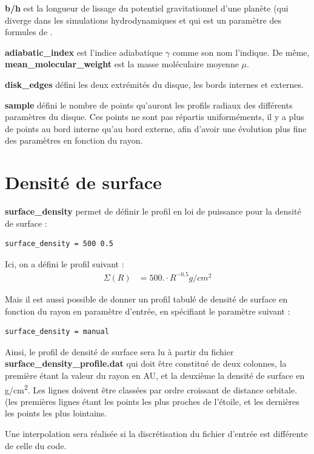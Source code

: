 \textbf{b/h} est la longueur de lissage du potentiel gravitationnel d'une planète (qui diverge dans les simulations hydrodynamiques et qui est un paramètre des formules de \cite{paardekooper2011torque}.

\textbf{adiabatic\_index} est l'indice adiabatique $\gamma$ comme son nom l'indique. De même, \textbf{mean\_molecular\_weight} est la masse moléculaire moyenne $\mu$.

\textbf{disk\_edges} défini les deux extrémités du disque, les bords internes et externes.

\textbf{sample} défini le nombre de points qu'auront les profils radiaux des différents paramètres du disque. Ces points ne sont pas répartis uniforméments, il y a plus de points au bord interne qu'au bord externe, afin d'avoir une évolution plus fine des paramètres en fonction du rayon.

\section{Densité de surface}
\textbf{surface\_density} permet de définir le profil en loi de puissance pour la densité de surface : 
\begin{verbatim}
surface_density = 500 0.5
\end{verbatim}
Ici, on a défini le profil suivant : 
\begin{align*}
\Sigma(R) &= 500. \cdot R^{-0.5} \unit{g/cm^2}
\end{align*}

Mais il est aussi possible de donner un profil tabulé de densité de surface en fonction du rayon en paramètre d'entrée, en spécifiant le paramètre suivant : 
\begin{verbatim}
surface_density = manual
\end{verbatim}
Ainsi, le profil de densité de surface sera lu à partir du fichier \textbf{surface\_density\_profile.dat} qui doit être constitué de deux colonnes, la première étant la valeur du rayon en AU, et la deuxième la densité de surface en \unit{g/cm^2}. Les lignes doivent être classées par ordre croissant de distance orbitale. (les premières lignes étant les points les plus proches de l'étoile, et les dernières les points les plus lointains. 

\begin{remarque}
Une interpolation sera réalisée si la discrétisation du fichier d'entrée est différente de celle du code.
\end{remarque}

